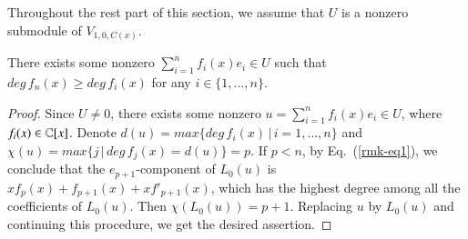 \documentclass[12pt]{amsart}
\begin{document}
Throughout the rest part of this section, we assume that $U$ is a nonzero submodule of $V_{1,0,C(x)}$.
\begin{lem}%
There exists some nonzero $\sum_{i=1}^n f_i(x)e_i\in U$ such that $deg\,f_n(x)\geq deg\,f_i(x)$ for any $i\in \{1, \ldots,n\}$.
\end{lem}
\begin{proof}
Since $U\neq 0$, there exists some nonzero $u=\sum_{i=1}^n f_i(x)e_i\in U$, where $f_i(x)\in \mathbb{C}[x]$. Denote $d(u)=max\{deg\,f_i(x)\,|\, i=1,\ldots,n\}$ and $\chi(u)=max\{j\,|\,deg\,f_j(x)=d(u)\}=p$. If $p<n$, by Eq.~(\ref{rmk-eq1}),
we conclude that the $e_{p+1}$-component of $L_0(u)$ is $xf_p(x)+f_{p+1}(x)+xf'_{p+1}(x)$, which has the highest degree among all the coefficients of $L_0(u)$.  Then $\chi(L_0(u))=p+1$. Replacing $u$ by $L_0(u)$ and continuing this procedure, we get the desired assertion.
\end{proof}
\end{document}
